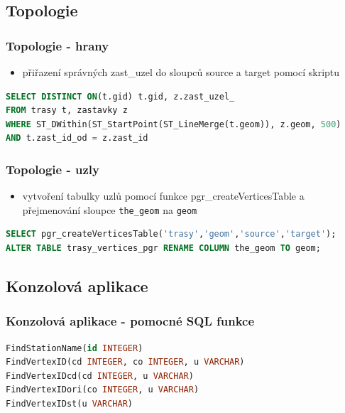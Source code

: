 \documentclass{beamer}
\begin{document}
\begin{frame}[fragile]
\section{Topologie}
\frametitle{Topologie - hrany}	
\begin{itemize}
	\item přiřazení správných zast\_uzel do sloupců source a target pomocí skriptu
\end{itemize}
\begin{exampleblock}{}
\begin{lstlisting}[columns=flexible, basicstyle=\footnotesize, language=sql]
SELECT DISTINCT ON(t.gid) t.gid, z.zast_uzel_ 
FROM trasy t, zastavky z 
WHERE ST_DWithin(ST_StartPoint(ST_LineMerge(t.geom)), z.geom, 500) 
AND t.zast_id_od = z.zast_id
\end{lstlisting}
\end{exampleblock}

\end{frame}

\begin{frame}[fragile]
\frametitle{Topologie - uzly}	

\begin{itemize}
	\item vytvoření tabulky uzlů pomocí funkce pgr\_createVerticesTable a přejmenování sloupce \texttt{the\_geom} na \texttt{geom}
\end{itemize}

\begin{exampleblock}{}
\begin{lstlisting}[columns=flexible, basicstyle=\footnotesize, language=sql]
SELECT pgr_createVerticesTable('trasy','geom','source','target');
ALTER TABLE trasy_vertices_pgr RENAME COLUMN the_geom TO geom;
\end{lstlisting}
\end{exampleblock}

\end{frame}

\begin{frame}[fragile]
\section{Konzolová aplikace}
\frametitle{Konzolová aplikace - pomocné SQL funkce}
\begin{exampleblock}{}
\begin{lstlisting}[columns=flexible, basicstyle=\footnotesize, language=sql]
FindStationName(id INTEGER)
FindVertexID(cd INTEGER, co INTEGER, u VARCHAR)
FindVertexIDcd(cd INTEGER, u VARCHAR)
FindVertexIDori(co INTEGER, u VARCHAR)
FindVertexIDst(u VARCHAR)
\end{lstlisting}
\end{exampleblock}
\end{frame}
\end{document}
